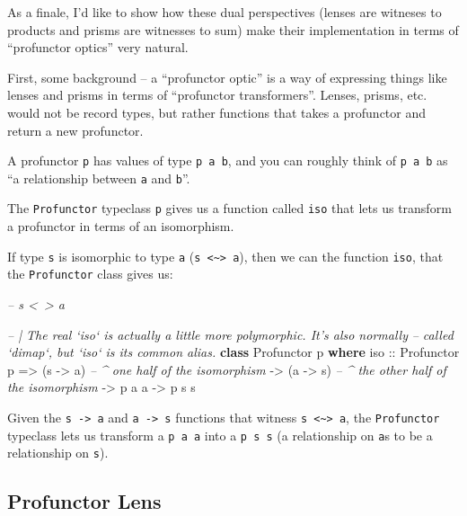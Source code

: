 \documentclass[]{article}
\newenvironment{Shaded}{}{}
\newcommand{\CommentTok}[1]{\textcolor[rgb]{0.38,0.63,0.69}{\textit{#1}}}
\newcommand{\DataTypeTok}[1]{\textcolor[rgb]{0.56,0.13,0.00}{#1}}
\newcommand{\KeywordTok}[1]{\textcolor[rgb]{0.00,0.44,0.13}{\textbf{#1}}}
\newcommand{\NormalTok}[1]{#1}
\newcommand{\OtherTok}[1]{\textcolor[rgb]{0.00,0.44,0.13}{#1}}
\begin{document}
As a finale, I'd like to show how these dual perspectives (lenses are witneses
to products and prisms are witnesses to sum) make their implementation in terms
of ``profunctor optics'' very natural.

First, some background -- a ``profunctor optic'' is a way of expressing things
like lenses and prisms in terms of ``profunctor transformers''. Lenses, prisms,
etc. would not be record types, but rather functions that takes a profunctor and
return a new profunctor.

A profunctor \texttt{p} has values of type \texttt{p\ a\ b}, and you can roughly
think of \texttt{p\ a\ b} as ``a relationship between \texttt{a} and
\texttt{b}''.

The \texttt{Profunctor} typeclass \texttt{p} gives us a function called
\texttt{iso} that lets us transform a profunctor in terms of an isomorphism.

If type \texttt{s} is isomorphic to type \texttt{a}
(\texttt{s\ \textless{}\textasciitilde{}\textgreater{}\ a}), then we can the
function \texttt{iso}, that the \texttt{Profunctor} class gives us:

\begin{Shaded}
\begin{Highlighting}[]
\CommentTok{-- s <~> a}

\CommentTok{-- | The real `iso` is actually a little more polymorphic.  It's also normally}
\CommentTok{-- called `dimap`, but `iso` is its common alias.}
\KeywordTok{class} \DataTypeTok{Profunctor}\NormalTok{ p }\KeywordTok{where}
\OtherTok{    iso ::} \DataTypeTok{Profunctor}\NormalTok{ p}
        \OtherTok{=>}\NormalTok{ (s }\OtherTok{->}\NormalTok{ a)         }\CommentTok{-- ^ one half of the isomorphism}
        \OtherTok{->}\NormalTok{ (a }\OtherTok{->}\NormalTok{ s)         }\CommentTok{-- ^ the other half of the isomorphism}
        \OtherTok{->}\NormalTok{ p a a}
        \OtherTok{->}\NormalTok{ p s s}
\end{Highlighting}
\end{Shaded}

Given the \texttt{s\ -\textgreater{}\ a} and \texttt{a\ -\textgreater{}\ s}
functions that witness
\texttt{s\ \textless{}\textasciitilde{}\textgreater{}\ a}, the
\texttt{Profunctor} typeclass lets us transform a \texttt{p\ a\ a} into a
\texttt{p\ s\ s} (a relationship on \texttt{a}s to be a relationship on
\texttt{s}).

\hypertarget{profunctor-lens}{%
\subsection{Profunctor Lens}\label{profunctor-lens}}
\end{document}
